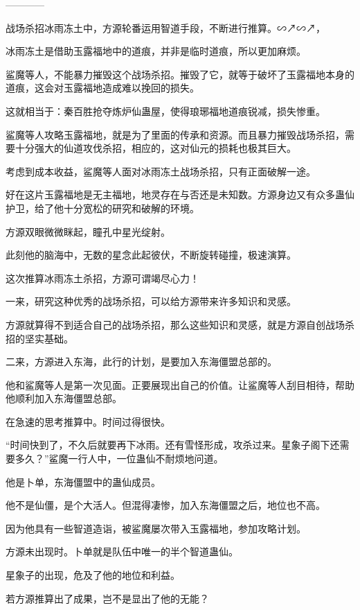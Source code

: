 
\begin{this_body}

------------

战场杀招冰雨冻土中，方源轮番运用智道手段，不断进行推算。∽↗∽↗，

冰雨冻土是借助玉露福地中的道痕，并非是临时道痕，所以更加麻烦。

鲨魔等人，不能暴力摧毁这个战场杀招。摧毁了它，就等于破坏了玉露福地本身的道痕，这会对玉露福地造成难以挽回的损失。

这就相当于：秦百胜抢夺炼炉仙蛊屋，使得琅琊福地道痕锐减，损失惨重。

鲨魔等人攻略玉露福地，就是为了里面的传承和资源。而且暴力摧毁战场杀招，需要十分强大的仙道攻伐杀招，相应的，这对仙元的损耗也极其巨大。

考虑到成本收益，鲨魔等人面对冰雨冻土战场杀招，只有正面破解一途。

好在这片玉露福地是无主福地，地灵存在与否还是未知数。方源身边又有众多蛊仙护卫，给了他十分宽松的研究和破解的环境。

方源双眼微微眯起，瞳孔中星光绽射。

此刻他的脑海中，无数的星念此起彼伏，不断旋转碰撞，极速演算。

这次推算冰雨冻土杀招，方源可谓竭尽心力！

一来，研究这种优秀的战场杀招，可以给方源带来许多知识和灵感。

方源就算得不到适合自己的战场杀招，那么这些知识和灵感，就是方源自创战场杀招的坚实基础。

二来，方源进入东海，此行的计划，是要加入东海僵盟总部的。

他和鲨魔等人是第一次见面。正要展现出自己的价值。让鲨魔等人刮目相待，帮助他顺利加入东海僵盟总部。

在急速的思考推算中。时间过得很快。

“时间快到了，不久后就要再下冰雨。还有雪怪形成，攻杀过来。星象子阁下还需要多久？”鲨魔一行人中，一位蛊仙不耐烦地问道。

他是卜单，东海僵盟中的蛊仙成员。

他不是仙僵，是个大活人。但混得凄惨，加入东海僵盟之后，地位也不高。

因为他具有一些智道造诣，被鲨魔屡次带入玉露福地，参加攻略计划。

方源未出现时。卜单就是队伍中唯一的半个智道蛊仙。

星象子的出现，危及了他的地位和利益。

若方源推算出了成果，岂不是显出了他的无能？


\end{this_body}
